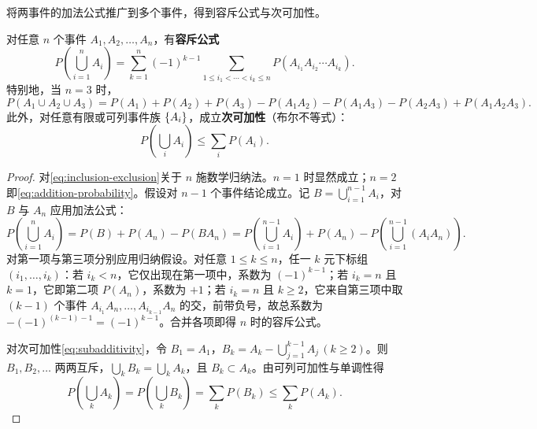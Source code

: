 将两事件的加法公式推广到多个事件，得到容斥公式与次可加性。

\begin{theorem}[容斥公式与次可加性]
\label{thm:inclusion-exclusion}
对任意 $n$ 个事件 $A_1,A_2,\ldots,A_n$，有\textbf{容斥公式}
\begin{equation}
  P\left(\bigcup_{i=1}^{n}A_i\right)
  =\sum_{k=1}^{n}(-1)^{k-1}
  \sum_{1\le i_1<\cdots<i_k\le n}P(A_{i_1}A_{i_2}\cdots A_{i_k}).
  \label{eq:inclusion-exclusion}
\end{equation}
特别地，当 $n=3$ 时，
\[
  P(A_1\cup A_2\cup A_3)
  =P(A_1)+P(A_2)+P(A_3)-P(A_1A_2)-P(A_1A_3)-P(A_2A_3)+P(A_1A_2A_3).
\]
此外，对任意有限或可列事件族 $\{A_i\}$，成立\textbf{次可加性}（布尔不等式）：
\begin{equation}
  P\left(\bigcup_{i}A_i\right)\le \sum_{i}P(A_i).
  \label{eq:subadditivity}
\end{equation}
\end{theorem}
\begin{proof}
对\eqref{eq:inclusion-exclusion}关于 $n$ 施数学归纳法。$n=1$ 时显然成立；$n=2$ 即\eqref{eq:addition-probability}。假设对 $n-1$ 个事件结论成立。记 $B=\bigcup_{i=1}^{n-1}A_i$，对 $B$ 与 $A_n$ 应用加法公式：
\[
  P\left(\bigcup_{i=1}^{n}A_i\right)
  =P(B)+P(A_n)-P(BA_n)
  =P\left(\bigcup_{i=1}^{n-1}A_i\right)+P(A_n)-P\left(\bigcup_{i=1}^{n-1}(A_iA_n)\right).
\]
对第一项与第三项分别应用归纳假设。对任意 $1\le k\le n$，任一 $k$ 元下标组 $(i_1,\ldots,i_k)$：若 $i_k<n$，它仅出现在第一项中，系数为 $(-1)^{k-1}$；若 $i_k=n$ 且 $k=1$，它即第二项 $P(A_n)$，系数为 $+1$；若 $i_k=n$ 且 $k\ge 2$，它来自第三项中取 $(k-1)$ 个事件 $A_{i_1}A_n,\ldots,A_{i_{k-1}}A_n$ 的交，前带负号，故总系数为 $-(-1)^{(k-1)-1}=(-1)^{k-1}$。合并各项即得 $n$ 时的容斥公式。

对次可加性\eqref{eq:subadditivity}，令 $B_1=A_1$，$B_k=A_k-\bigcup_{j=1}^{k-1}A_j\,(k\ge 2)$。则 $B_1,B_2,\ldots$ 两两互斥，$\bigcup_k B_k=\bigcup_k A_k$，且 $B_k\subset A_k$。由可列可加性与单调性得
\[
  P\left(\bigcup_{k}A_k\right)=P\left(\bigcup_{k}B_k\right)=\sum_{k}P(B_k)\le\sum_{k}P(A_k).
\]
\end{proof}

